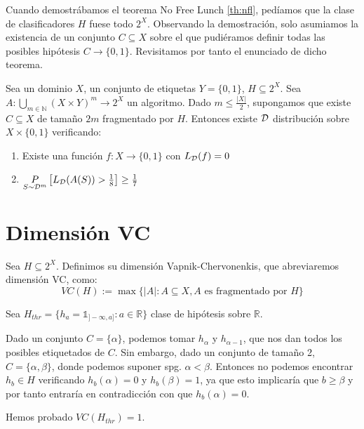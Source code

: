 Cuando demostrábamos el teorema No Free Lunch \ref{th:nfl}, pedíamos que la clase de clasificadores $H$ fuese todo $2^X$. 
Observando la demostración, solo asumiamos la existencia de un conjunto $C\subseteq X$ sobre el que pudiéramos definir 
todas las posibles hipótesis $C \rightarrow \{0,1\}$. Revisitamos por tanto el enunciado de dicho teorema.

\begin{theorem}
Sea un dominio $X$, un conjunto de etiquetas $Y=\{0,1\}$, $H \subseteq 2^X$.
Sea $A: \underset{m\in \mathbb{N}}{\bigcup} (X\times Y)^m \rightarrow 2^X$ un algoritmo. Dado $m \le \frac{|X|}{2}$,
supongamos que existe $C\subseteq X$ de tamaño $2m$ fragmentado por $H$. Entonces existe $\mathcal{D}$ distribución sobre 
$X\times \{0,1\}$ verificando:
\begin{enumerate}[i]
\item Existe una función $f: X \rightarrow \{0,1\}$ con $L_{\mathcal{D}}(f)=0$
\item $\underset{S\sim \mathcal{D}^m}{P} \left[ L_{\mathcal{D}}(A(S)) > \frac{1}{8} \right] \ge \frac{1}{7}$
\end{enumerate}

\label{th:nfl2}
\end{theorem}


\section{Dimensión VC}
\begin{definition}[Dimensión VC]
Sea $H \subseteq 2^X$. Definimos su dimensión Vapnik-Chervonenkis, que abreviaremos dimensión VC, como:
\[
  VC(H) := \max \{|A| : A\subseteq X, A \textrm{ es fragmentado por } H\}
\]
\end{definition}


\begin{example}
Sea $H_{thr} = \{h_a = \mathds{1}_{]-\infty, a]}: a\in \mathbb{R}\}$ clase de hipótesis sobre $\mathbb{R}$. 

Dado un conjunto $C=\{\alpha\}$, podemos tomar $h_{\alpha}$ y $h_{\alpha-1}$, que nos dan todos los posibles etiquetados de
$C$. Sin embargo, dado un conjunto de tamaño 2, $C=\{\alpha, \beta\}$, donde podemos suponer spg. $\alpha < \beta$. 
Entonces no podemos encontrar $h_b \in H$ verificando $h_b(\alpha)=0$ y $h_b(\beta) = 1$, ya que esto implicaría que 
$b \ge \beta$ y por tanto entraría en contradicción con que $h_b(\alpha) = 0$.

Hemos probado $VC(H_{thr}) = 1$.
\end{example}

